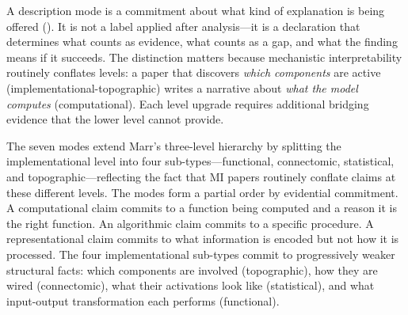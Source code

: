 \documentclass{article}
\begin{document}
A description mode is a commitment about what kind of explanation is being offered (). It is not a label applied after analysis---it is a declaration that determines what counts as evidence, what counts as a gap, and what the finding means if it succeeds. The distinction matters because mechanistic interpretability routinely conflates levels: a paper that discovers \emph{which components} are active (implementational-topographic) writes a narrative about \emph{what the model computes} (computational). Each level upgrade requires additional bridging evidence that the lower level cannot provide.

The seven modes extend Marr's three-level hierarchy \citep{marr1982vision} by splitting the implementational level into four sub-types---functional, connectomic, statistical, and topographic---reflecting the fact that MI papers routinely conflate claims at these different levels. The modes form a partial order by evidential commitment. A computational claim commits to a function being computed and a reason it is the right function. An algorithmic claim commits to a specific procedure. A representational claim commits to what information is encoded but not how it is processed. The four implementational sub-types commit to progressively weaker structural facts: which components are involved (topographic), how they are wired (connectomic), what their activations look like (statistical), and what input-output transformation each performs (functional).
\end{document}
